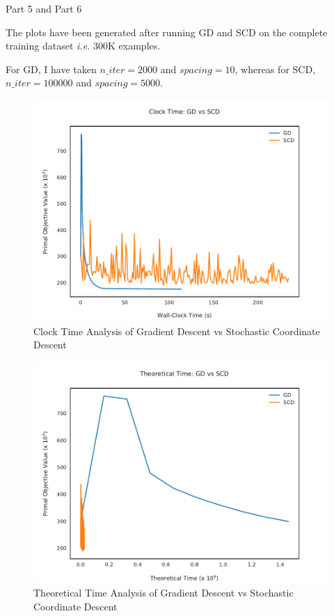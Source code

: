 \documentclass[a4paper,11pt]{article}
\begin{document}
\begin{mlsolution}
\begin{qpart}{4}
    \end{qpart}

    \begin{qsection}{Part 5 and Part 6}

        The plots have been generated after running GD and SCD on the complete training dataset \textit{i.e.} 300K examples. \br%

        For GD, I have taken $n\_iter = 2000$ and $spacing = 10$, whereas for SCD, $n\_iter = 100000$ and $spacing = 5000$. \br%

        \begin{figure}[h!]\label{fig:q4-clock}
            \centering
            \includegraphics{q4-plot-clocktime.pdf}
            \caption{Clock Time Analysis of Gradient Descent vs Stochastic Coordinate Descent}
        \end{figure}
        
        \begin{figure}[h!]
            \centering
            \includegraphics{q4-plot-theoreticaltime.pdf}
            \caption{Theoretical Time Analysis of Gradient Descent vs Stochastic Coordinate Descent}
        \end{figure}
 

\end{qsection}
\end{mlsolution}
\end{document}
